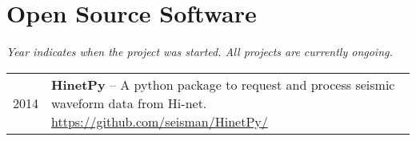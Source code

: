 \section{Open Source Software}

\emph{Year indicates when the project was started. All projects are currently ongoing.}

\begin{tabular}{p{} p{}}
2014 & \textbf{HinetPy} -- A python package to request and process seismic waveform data from Hi-net. \newline
       \url{https://github.com/seisman/HinetPy/} \\
\end{tabular}
